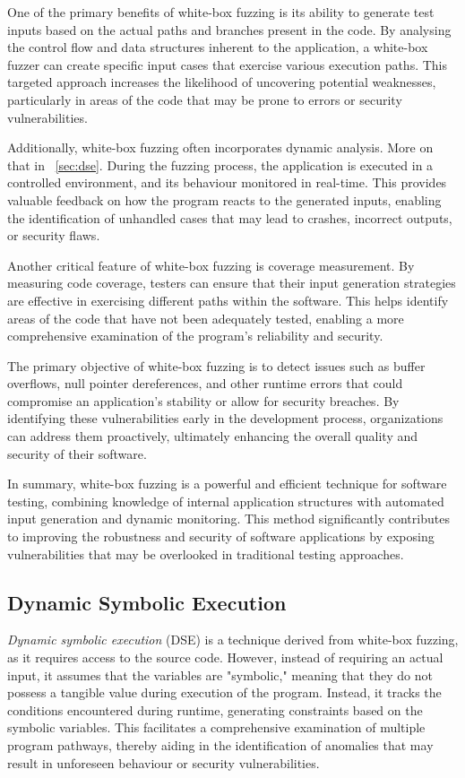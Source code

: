 One of the primary benefits of white-box fuzzing is its ability to generate test inputs based on the actual paths and branches present in the code. By analysing the control flow and data structures inherent to the application, a white-box fuzzer can create specific input cases that exercise various execution paths. This targeted approach increases the likelihood of uncovering potential weaknesses, particularly in areas of the code that may be prone to errors or security vulnerabilities.

Additionally, white-box fuzzing often incorporates dynamic analysis. More on that in ~\autoref{sec:dse}. During the fuzzing process, the application is executed in a controlled environment, and its behaviour monitored in real-time. This provides valuable feedback on how the program reacts to the generated inputs, enabling the identification of unhandled cases that may lead to crashes, incorrect outputs, or security flaws.

Another critical feature of white-box fuzzing is coverage measurement. By measuring code coverage, testers can ensure that their input generation strategies are effective in exercising different paths within the software. This helps identify areas of the code that have not been adequately tested, enabling a more comprehensive examination of the program's reliability and security.

The primary objective of white-box fuzzing is to detect issues such as buffer overflows, null pointer dereferences, and other runtime errors that could compromise an application’s stability or allow for security breaches. By identifying these vulnerabilities early in the development process, organizations can address them proactively, ultimately enhancing the overall quality and security of their software.

In summary, white-box fuzzing is a powerful and efficient technique for software testing, combining knowledge of internal application structures with automated input generation and dynamic monitoring. This method significantly contributes to improving the robustness and security of software applications by exposing vulnerabilities that may be overlooked in traditional testing approaches.\cite{godefroid_random_2007}




\subsection{Dynamic Symbolic Execution}
\label{sec:dse}
\textit{Dynamic symbolic execution} (DSE) is a technique derived from white-box fuzzing, as it requires access to the source code. However, instead of requiring an actual input, it assumes that the variables are "symbolic," meaning that they do not possess a tangible value during execution of the program. Instead, it tracks the conditions encountered during runtime, generating constraints based on the symbolic variables. 
This facilitates a comprehensive examination of multiple program pathways, thereby aiding in the identification of anomalies that may result in unforeseen behaviour or security vulnerabilities.

